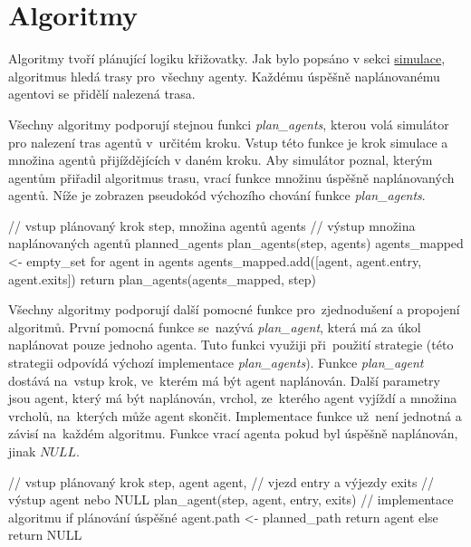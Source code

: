 \chapter{Algoritmy}\label{ch:algoritmy}

%

Algoritmy tvoří plánující logiku křižovatky.
Jak bylo popsáno v sekci \hyperref[sec:simulace]{simulace}, algoritmus hledá trasy pro~všechny agenty.
Každému úspěšně naplánovanému agentovi se přidělí nalezená trasa.

Všechny algoritmy podporují stejnou funkci \emph{plan\_agents},
kterou volá simulátor pro nalezení tras agentů v~určitém kroku.
Vstup této funkce je krok simulace a množina agentů přijíždějících v daném kroku.
Aby simulátor poznal, kterým agentům přiřadil algoritmus trasu, vrací funkce množinu úspěšně naplánovaných agentů.
Níže je zobrazen pseudokód výchozího chování funkce \emph{plan\_agents}.

\begin{code}[xrightmargin=6em]
// vstup plánovaný krok step, množina agentů agents
// výstup množina naplánovaných agentů planned_agents
plan_agents(step, agents)
    agents_mapped <- empty_set
    for agent in agents
      agents_mapped.add([agent, agent.entry, agent.exits])
    return plan_agents(agents_mapped, step)
\end{code}

Všechny algoritmy podporují další pomocné funkce pro~zjednodušení a propojení algoritmů.
První pomocná funkce se~nazývá \emph{plan\_agent},
která má za úkol naplánovat pouze jednoho agenta.
Tuto funkci využiji při~použití  strategie
(této strategii odpovídá výchozí implementace \emph{plan\_agents}).
Funkce \emph{plan\_agent} dostává na~vstup krok, ve~kterém má být agent naplánován.
Další parametry jsou agent, který má být naplánován, vrchol,
ze~kterého agent vyjíždí a množina vrcholů, na~kterých může agent skončit.
Implementace funkce už~není jednotná a závisí na~každém algoritmu.
Funkce vrací agenta pokud byl úspěšně naplánován, jinak $NULL$.

\begin{code}[xrightmargin=14em]
// vstup plánovaný krok step, agent agent,
// vjezd entry a výjezdy exits
// výstup agent nebo NULL
plan_agent(step, agent, entry, exits)
  // implementace algoritmu
  if plánování úspěšné
    agent.path <- planned_path
    return agent
  else
    return NULL
\end{code}

